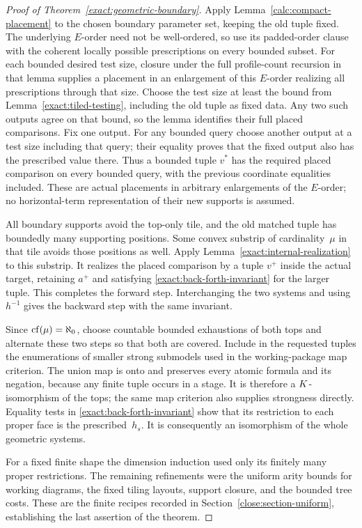 \begin{proof}[Proof of Theorem~\ref{exact:geometric-boundary}]
Apply Lemma~\ref{calc:compact-placement} to the chosen boundary
parameter set, keeping the old tuple fixed.  The underlying $E$-order
need not be well-ordered, so use its padded-order clause with the
coherent locally possible prescriptions on every bounded subset.
For each bounded desired test size, closure under the full
profile-count recursion in that lemma supplies a placement in an
enlargement of this $E$-order realizing all prescriptions through
that size.  Choose the test size at least the bound from
Lemma~\ref{exact:tiled-testing}, including the old tuple as fixed
data.  Any two such outputs agree on that bound, so the lemma
identifies their full placed comparisons.  Fix one output.  For any
bounded query choose another output at a test size including that
query; their equality proves that the fixed output also has the
prescribed value there.  Thus a bounded tuple $v^*$ has the required
placed comparison on every bounded query, with the previous
coordinate equalities included.  These are actual placements in
arbitrary enlargements of the $E$-order; no horizontal-term
representation of their new supports is assumed.

All boundary supports avoid the top-only tile, and the old matched
tuple has boundedly many supporting positions.  Some convex
substrip of cardinality~$\mu$ in that tile avoids those positions
as well.  Apply Lemma~\ref{exact:internal-realization} to this
substrip.  It realizes the placed comparison by a tuple $v^+$
inside the actual target, retaining $a^+$ and satisfying
\eqref{exact:back-forth-invariant} for the larger tuple.  This
completes the forward step.  Interchanging the two systems and
using $h^{-1}$ gives the backward step with the same invariant.

Since $\operatorname{cf}(\mu)=\aleph_0$, choose countable bounded exhaustions
of both tops and alternate these two steps so that both are
covered.  Include in the requested tuples the enumerations of
smaller strong submodels used in the working-package map
criterion.  The union map is onto and preserves every atomic
formula and its negation, because any finite tuple occurs in a
stage.  It is therefore a $K$-isomorphism of the tops; the same
map criterion also supplies strongness directly.  Equality tests
in \eqref{exact:back-forth-invariant} show that its restriction
to each proper face is the prescribed~$h_s$.  It is consequently
an isomorphism of the whole geometric systems.

For a fixed finite shape the dimension induction used only its
finitely many proper restrictions.  The remaining refinements
were the uniform arity bounds for working diagrams, the fixed
tiling layouts, support closure, and the bounded tree costs.
These are the finite recipes recorded in
Section~\ref{close:section-uniform}, establishing the last
assertion of the theorem.
\end{proof}
